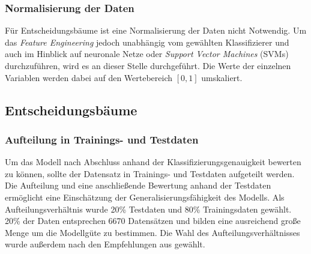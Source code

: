 \subsubsection{Normalisierung der Daten}
Für Entscheidungsbäume ist eine Normalisierung der Daten nicht Notwendig. Um das \emph{Feature Engineering} jedoch unabhängig vom gewählten Klassifizierer und auch im Hinblick auf neuronale Netze oder \emph{Support Vector Machines} (SVMs) durchzuführen, wird es an dieser Stelle durchgeführt. Die Werte der einzelnen Variablen werden dabei auf den Wertebereich $[0, 1]$ umskaliert.
 

\vspace{1cm}
\subsection{Entscheidungsbäume}
\label{section:Entscheidungsbäume}
\subsubsection{Aufteilung in Trainings- und Testdaten}
\label{section:train_test_split}
Um das Modell nach Abschluss anhand der Klassifizierungsgenauigkeit bewerten zu können, sollte der Datensatz in Trainings- und Testdaten aufgeteilt werden. Die Aufteilung und eine anschließende Bewertung anhand der Testdaten ermöglicht eine Einschätzung der Generalisierungsfähigkeit des Modells. Als Aufteilungsverhältnis wurde 20\% Testdaten und 80\% Trainingsdaten gewählt. 20\% der Daten entsprechen 6670 Datensätzen und bilden eine ausreichend große Menge um die Modellgüte zu bestimmen. Die Wahl des Aufteilungsverhältnisses wurde außerdem nach den Empfehlungen aus \cite{geron2017hands-on} gewählt.

